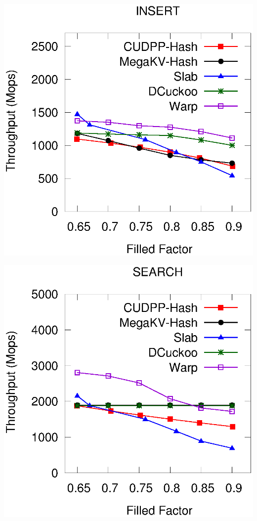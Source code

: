 \begin{minipage}{\textwidth}
\begin{minipage}[b]{0.49\textwidth}
\begin{minipage}{0.49\textwidth}
			\centerline{}
		\end{minipage}
	\end{minipage}
	\hfill
	\begin{minipage}[b]{0.49\textwidth}
		\begin{minipage}{0.49\linewidth}\centering
			\includegraphics[width=\textwidth]{../pic/static-load_factor/reddit/insert.eps}
			\centerline{}
		\end{minipage}
		\hfill
		\begin{minipage}{0.49\linewidth}\centering
			\includegraphics[width=\textwidth]{../pic/static-load_factor/reddit/search.eps}

\end{minipage}
\end{minipage}
\end{minipage}
